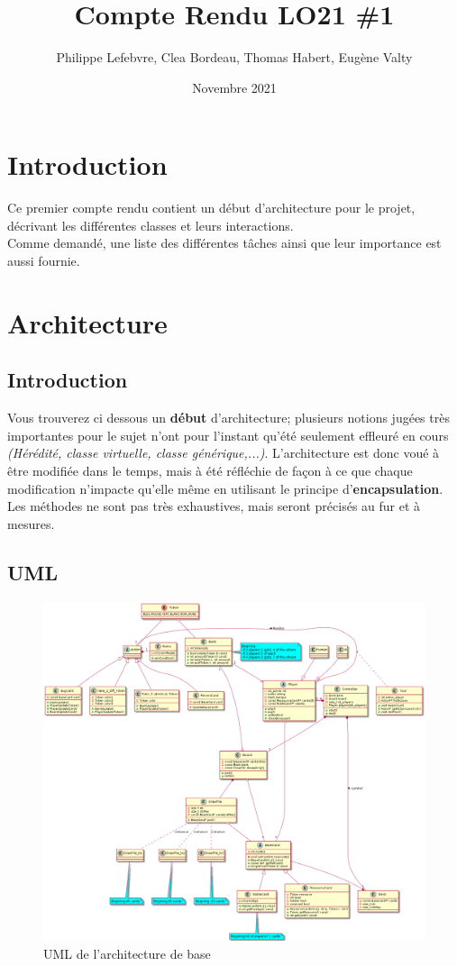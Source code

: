 \documentclass[12pt, letterpaper]{article}
\title{Compte Rendu LO21 \#1}
\author{Philippe Lefebvre, Clea Bordeau, Thomas Habert, Eugène Valty}
\date{Novembre 2021}
\begin{document}
\maketitle

\renewcommand{\contentsname}{Sommaire}
\tableofcontents

\section{Introduction}
Ce premier compte rendu contient un début d'architecture pour le projet, décrivant les différentes classes et leurs interactions.\\
Comme demandé, une liste des différentes tâches ainsi que leur importance est aussi fournie.
\section{Architecture}
\subsection{Introduction}
Vous trouverez ci dessous un \textbf{début} d'architecture; plusieurs notions jugées très importantes pour le sujet n'ont pour l'instant qu'été seulement effleuré en cours \textit{(Hérédité, classe virtuelle, classe générique,...)}. L'architecture est donc voué à être modifiée dans le temps, mais à été réfléchie de façon à ce que chaque modification n'impacte qu'elle même en utilisant le principe d'\textbf{encapsulation}.\\
Les méthodes ne sont pas très exhaustives, mais seront précisés au fur et à mesures.
\subsection{UML}
\begin{figure}[h]
\centering
\includegraphics[width=\textwidth]{uml.png}
\caption{UML de l'architecture de base}
\end{figure}
\end{document}
